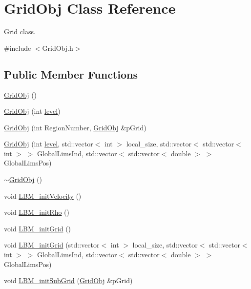 \hypertarget{class_grid_obj}{}\section{Grid\+Obj Class Reference}
\label{class_grid_obj}


Grid class.  




{\ttfamily \#include $<$Grid\+Obj.\+h$>$}

\subsection*{Public Member Functions}
\begin{DoxyCompactItemize}
\item 
\hyperlink{class_grid_obj_acc3416599b59236e87b6b60a07e678af}{Grid\+Obj} ()
\item 
\hyperlink{class_grid_obj_aaadde3417da5f31e1b8b33635487b56e}{Grid\+Obj} (int \hyperlink{class_grid_obj_a7dfedc4442a386ec15c8b03ca899c1a9}{level})
\item 
\hyperlink{class_grid_obj_a40600a8b8a286b8299bca8265b62f51b}{Grid\+Obj} (int Region\+Number, \hyperlink{class_grid_obj}{Grid\+Obj} \&p\+Grid)
\item 
\hyperlink{class_grid_obj_abc1ce149816c2f96870a859ce28c598d}{Grid\+Obj} (int \hyperlink{class_grid_obj_a7dfedc4442a386ec15c8b03ca899c1a9}{level}, std\+::vector$<$ int $>$ local\+\_\+size, std\+::vector$<$ std\+::vector$<$ int $>$ $>$ Global\+Lims\+Ind, std\+::vector$<$ std\+::vector$<$ double $>$ $>$ Global\+Lims\+Pos)
\item 
\hyperlink{class_grid_obj_ace563099d85c330ac48f35b515422522}{$\sim$\+Grid\+Obj} ()
\item 
void \hyperlink{class_grid_obj_aa8041f7344af6cf9732199aa107fdbc6}{L\+B\+M\+\_\+init\+Velocity} ()
\item 
void \hyperlink{class_grid_obj_aac0e8a3fe74c69b3308ef3e19100f95c}{L\+B\+M\+\_\+init\+Rho} ()
\item 
void \hyperlink{class_grid_obj_aeea74cc13001620abec1ba819233f714}{L\+B\+M\+\_\+init\+Grid} ()
\item 
void \hyperlink{class_grid_obj_adfbe5c22b6b6f076615ea7b77c2d7cc4}{L\+B\+M\+\_\+init\+Grid} (std\+::vector$<$ int $>$ local\+\_\+size, std\+::vector$<$ std\+::vector$<$ int $>$ $>$ Global\+Lims\+Ind, std\+::vector$<$ std\+::vector$<$ double $>$ $>$ Global\+Lims\+Pos)
\item 
void \hyperlink{class_grid_obj_a697f4d7fc6c9ed18e609528847b1e175}{L\+B\+M\+\_\+init\+Sub\+Grid} (\hyperlink{class_grid_obj}{Grid\+Obj} \&p\+Grid)

\end{DoxyCompactItemize}
